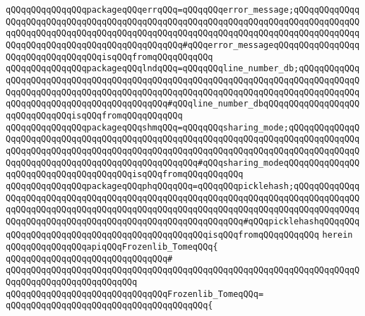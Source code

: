 \verb|qQQqqQQqqQQqqQQqpackageqQQqerrqQQq=qQQqqQQqerror_message;qQQqqQQqqQQqqQQqqQQqqQQqqQQqqQQqqQQqqQQqqQQqqQQqqQQqqQQqqQQqqQQqqQQqqQQqqQQqqQQqqQQqqQQqqQQqqQQqqQQqqQQqqQQqqQQqqQQqqQQqqQQqqQQqqQQqqQQqqQQqqQQqqQQqqQQqqQQqqQQqqQQqqQQqqQQqqQQqqQQqqQQqqQQq#qQQqerror_messageqQQqqQQqqQQqqQQqqQQqqQQqqQQqqQQqqQQqisqQQqfromqQQqqQQqqQQq|\newline
\verb|qQQqqQQqqQQqqQQqpackageqQQqlndqQQq=qQQqqQQqline_number_db;qQQqqQQqqQQqqQQqqQQqqQQqqQQqqQQqqQQqqQQqqQQqqQQqqQQqqQQqqQQqqQQqqQQqqQQqqQQqqQQqqQQqqQQqqQQqqQQqqQQqqQQqqQQqqQQqqQQqqQQqqQQqqQQqqQQqqQQqqQQqqQQqqQQqqQQqqQQqqQQqqQQqqQQqqQQqqQQqqQQqqQQq#qQQqline_number_dbqQQqqQQqqQQqqQQqqQQqqQQqqQQqqQQqisqQQqfromqQQqqQQqqQQq|\newline
\verb|qQQqqQQqqQQqqQQqpackageqQQqshmqQQq=qQQqqQQqsharing_mode;qQQqqQQqqQQqqQQqqQQqqQQqqQQqqQQqqQQqqQQqqQQqqQQqqQQqqQQqqQQqqQQqqQQqqQQqqQQqqQQqqQQqqQQqqQQqqQQqqQQqqQQqqQQqqQQqqQQqqQQqqQQqqQQqqQQqqQQqqQQqqQQqqQQqqQQqqQQqqQQqqQQqqQQqqQQqqQQqqQQqqQQqqQQqqQQq#qQQqsharing_modeqQQqqQQqqQQqqQQqqQQqqQQqqQQqqQQqqQQqqQQqisqQQqfromqQQqqQQqqQQq|\newline
\verb|qQQqqQQqqQQqqQQqpackageqQQqphqQQqqQQq=qQQqqQQqpicklehash;qQQqqQQqqQQqqQQqqQQqqQQqqQQqqQQqqQQqqQQqqQQqqQQqqQQqqQQqqQQqqQQqqQQqqQQqqQQqqQQqqQQqqQQqqQQqqQQqqQQqqQQqqQQqqQQqqQQqqQQqqQQqqQQqqQQqqQQqqQQqqQQqqQQqqQQqqQQqqQQqqQQqqQQqqQQqqQQqqQQqqQQqqQQqqQQqqQQqqQQq#qQQqpicklehashqQQqqQQqqQQqqQQqqQQqqQQqqQQqqQQqqQQqqQQqqQQqqQQqisqQQqfromqQQqqQQqqQQq|\newline
\verb|herein|\newline
\newline
\verb|qQQqqQQqqQQqqQQqapiqQQqFrozenlib_TomeqQQq{|\newline
\verb|qQQqqQQqqQQqqQQqqQQqqQQqqQQqqQQq#|\newline
\verb|qQQqqQQqqQQqqQQqqQQqqQQqqQQqqQQqqQQqqQQqqQQqqQQqqQQqqQQqqQQqqQQqqQQqqQQqqQQqqQQqqQQqqQQqqQQqqQQq|\newline
\verb|qQQqqQQqqQQqqQQqqQQqqQQqqQQqqQQqFrozenlib_TomeqQQq=|\newline
\verb|qQQqqQQqqQQqqQQqqQQqqQQqqQQqqQQqqQQqqQQq{|\newline
